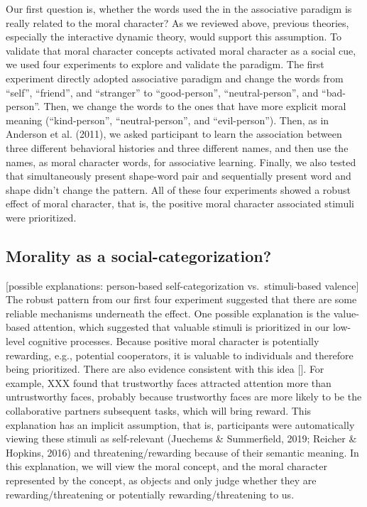 \documentclass[
  english,
  man]{apa6}
\begin{document}
Our first question is, whether the words used the in the associative paradigm is really related to the moral character? As we reviewed above, previous theories, especially the interactive dynamic theory, would support this assumption. To validate that moral character concepts activated moral character as a social cue, we used four experiments to explore and validate the paradigm. The first experiment directly adopted associative paradigm and change the words from \enquote{self}, \enquote{friend}, and \enquote{stranger} to \enquote{good-person}, \enquote{neutral-person}, and \enquote{bad-person}. Then, we change the words to the ones that have more explicit moral meaning (\enquote{kind-person}, \enquote{neutral-person}, and \enquote{evil-person}). Then, as in Anderson et al. (2011), we asked participant to learn the association between three different behavioral histories and three different names, and then use the names, as moral character words, for associative learning. Finally, we also tested that simultaneously present shape-word pair and sequentially present word and shape didn't change the pattern. All of these four experiments showed a robust effect of moral character, that is, the positive moral character associated stimuli were prioritized.

\hypertarget{morality-as-a-social-categorization}{%
\subsection{Morality as a social-categorization?}\label{morality-as-a-social-categorization}}

{[}possible explanations: person-based self-categorization vs.~stimuli-based valence{]} The robust pattern from our first four experiment suggested that there are some reliable mechanisms underneath the effect. One possible explanation is the value-based attention, which suggested that valuable stimuli is prioritized in our low-level cognitive processes. Because positive moral character is potentially rewarding, e.g., potential cooperators, it is valuable to individuals and therefore being prioritized. There are also evidence consistent with this idea {[}{]}. For example, XXX found that trustworthy faces attracted attention more than untrustworthy faces, probably because trustworthy faces are more likely to be the collaborative partners subsequent tasks, which will bring reward. This explanation has an implicit assumption, that is, participants were automatically viewing these stimuli as self-relevant (Juechems \& Summerfield, 2019; Reicher \& Hopkins, 2016) and threatening/rewarding because of their semantic meaning. In this explanation, we will view the moral concept, and the moral character represented by the concept, as objects and only judge whether they are rewarding/threatening or potentially rewarding/threatening to us.
\end{document}
